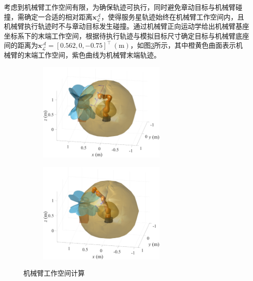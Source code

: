 \documentclass[lang=chs, degree=master, blindreview=false, winfonts=true]{yanputhesis}
\begin{document}
考虑到机械臂工作空间有限，为确保轨迹可执行，同时避免章动目标与机械臂碰撞，需确定一合适的相对距离${{\boldsymbol{x}}_\mathcal{L}^{\mathcal{A}}}$，使得服务星轨迹始终在机械臂工作空间内，且机械臂执行轨迹时不与章动目标发生碰撞。通过机械臂正向运动学给出机械臂基座坐标系下的末端工作空间，根据待执行轨迹与模拟目标尺寸确定目标与机械臂底座间的距离为${{\boldsymbol{x}}_\mathcal{L}^{\mathcal{A}}}=[0.562,0,-0.75]^{\top}\ (\mathrm{m})$，如图\ref{Fig.arm_workplace}所示，其中橙黄色曲面表示机械臂的末端工作空间，紫色曲线为机械臂末端轨迹。
\begin{figure}[htbp]
	\centering
	\begin{minipage}[t]{0.96\textwidth}
		\begin{subfigure}[t]{0.47\textwidth}
			\centering
			\includegraphics[width = 2.5in]{picture/workplace1.eps}
			\caption{ }
			\label{fig:workplace1}
		\end{subfigure}\hfill
		\begin{subfigure}[t]{0.47\textwidth}
			\centering
			\includegraphics[width = 2.5in]{picture/workplace2.eps}
			\caption{ }
			\label{fig:workplace2}
		\end{subfigure}
	\end{minipage}
	\caption{机械臂工作空间计算\label{Fig.arm_workplace}}
\end{figure}
\end{document}
